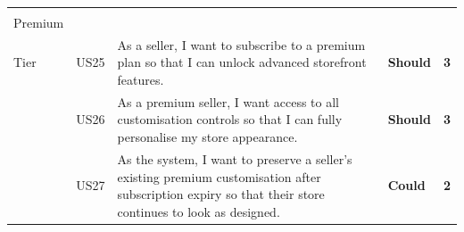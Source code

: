 \documentclass[12pt, a4paper, oneside]{report}
\begin{document}
\begin{longtable}{|>{\centering\arraybackslash\small}p{2.2cm}|>{\centering\arraybackslash\small}p{0.9cm}|>{\small}p{7.6cm}|>{\centering\arraybackslash\small}p{1.4cm}|>{\centering\arraybackslash\small}p{0.7cm}|}
  \cellcolor{featPremium}\makecell[c]{\textbf{F7}\\\small Premium\\Tier}
  & US25 & As a seller, I want to subscribe to a premium plan so that I can unlock advanced storefront features.
  & \cellcolor{moscowShould}\textbf{Should} & \cellcolor{complexHigh}\textbf{3} \\\hline
  \cellcolor{featPremium}~
  & US26 & As a premium seller, I want access to all customisation controls so that I can fully personalise my store appearance.
  & \cellcolor{moscowShould}\textbf{Should} & \cellcolor{complexHigh}\textbf{3} \\\hline
  \cellcolor{featPremium}~
  & US27 & As the system, I want to preserve a seller's existing premium customisation after subscription expiry so that their store continues to look as designed.
  & \cellcolor{moscowCould}\textbf{Could} & \cellcolor{complexMed}\textbf{2} \\\hline


\end{longtable}
\end{document}
